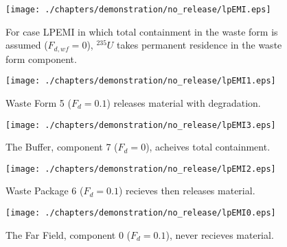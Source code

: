 



\begin{figure}[ht]
\centering
\texttt{[image: ./chapters/demonstration/no\_release/lpEMI.eps]}
\caption[$^{235}U$ residence. Lumped Parameter EM Waste Form No Release.]{
For case LPEMI in which total containment in the waste form is assumed 
($F_{d,wf}=0$), $^{235}U$ 
takes permanent residence in the waste form component.
}
\label{fig:lpEMIall}
\begin{minipage}[b]{0.45\linewidth}

  \texttt{[image: ./chapters/demonstration/no\_release/lpEMI1.eps]}
  \caption[LPEMI Waste Form Contaminants.]{
    Waste Form 5 ($F_d = 0.1$) releases material with degradation. 
    }
  \label{fig:lpEMIwf5}
  
  \texttt{[image: ./chapters/demonstration/no\_release/lpEMI3.eps]}
  \caption[Case LPEMI Buffer Contaminants]{
    The Buffer, component 7 ($F_d=0$), acheives total containment.
    }
  \label{fig:lpEMIbuff}

\end{minipage}
\hspace{0.05\linewidth}
\begin{minipage}[b]{0.45\linewidth}
  \texttt{[image: ./chapters/demonstration/no\_release/lpEMI2.eps]}
  \caption[Case LPEMI Waste Package Contaminants.]{ 
    Waste Package 6 ($F_d = 0.1$) recieves then releases material. 
    }
  \label{fig:lpEMIwp6}

  \texttt{[image: ./chapters/demonstration/no\_release/lpEMI0.eps]}
  \caption[Case LPEMI Waste Package Contaminants.]{ 
    The Far Field, component 0 ($F_d = 0.1$), never recieves material.
    }
  \label{fig:lpEMIff0}


  \end{minipage}
\end{figure}
